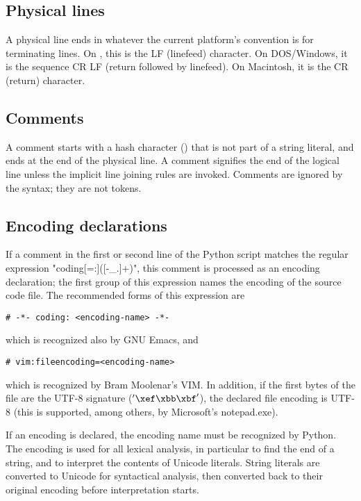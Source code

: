 \subsection{Physical lines\label{physical}}

A physical line ends in whatever the current platform's convention is
for terminating lines.  On \UNIX, this is the \ASCII{} LF (linefeed)
character.  On DOS/Windows, it is the \ASCII{} sequence CR LF (return
followed by linefeed).  On Macintosh, it is the \ASCII{} CR (return)
character.


\subsection{Comments\label{comments}}

A comment starts with a hash character (\code{\#}) that is not part of
a string literal, and ends at the end of the physical line.  A comment
signifies the end of the logical line unless the implicit line joining
rules are invoked.
Comments are ignored by the syntax; they are not tokens.


\subsection{Encoding declarations\label{encodings}}

If a comment in the first or second line of the Python script matches
the regular expression "coding[=:]\s*([\w-_.]+)", this comment is
processed as an encoding declaration; the first group of this
expression names the encoding of the source code file. The recommended
forms of this expression are

\begin{verbatim}
# -*- coding: <encoding-name> -*-
\end{verbatim}

which is recognized also by GNU Emacs, and

\begin{verbatim}
# vim:fileencoding=<encoding-name>
\end{verbatim}

which is recognized by Bram Moolenar's VIM. In addition, if the first
bytes of the file are the UTF-8 signature ($'\xef\xbb\xbf'$), the
declared file encoding is UTF-8 (this is supported, among others, by
Microsoft's notepad.exe).

If an encoding is declared, the encoding name must be recognized by
Python. %
The encoding is used for all lexical analysis, in particular to find
the end of a string, and to interpret the contents of Unicode literals.
String literals are converted to Unicode for syntactical analysis,
then converted back to their original encoding before interpretation
starts.

